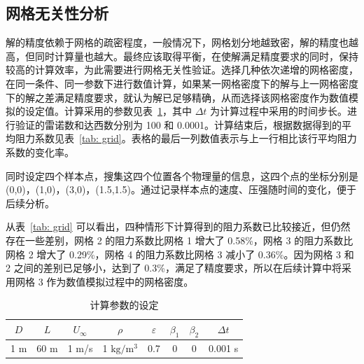 \subsection{网格无关性分析}\label{subsec: grid-independent}

解的精度依赖于网格的疏密程度，一般情况下，网格划分地越致密，解的精度也越高，但同时计算量也越大。最终应该取得平衡，在使解满足精度要求的同时，保持较高的计算效率，为此需要进行网格无关性验证。选择几种依次递增的网格密度，在同一条件、同一参数下进行数值计算，如果某一网格密度下的解与上一网格密度下的解之差满足精度要求，就认为解已足够精确，从而选择该网格密度作为数值模拟的设定值。计算采用的参数见表~\ref{tab: parameters}，其中 $\Delta t$ 为计算过程中采用的时间步长。进行验证的雷诺数和达西数分别为 100 和 0.0001。计算结束后，根据数据得到的平均阻力系数见表~\ref{tab: grid}。表格的最后一列数值表示与上一行相比该行平均阻力系数的变化率。

同时设定四个样本点，搜集这四个位置各个物理量的信息，这四个点的坐标分别是 (0,0)，(1,0)，(3,0)，(1.5,1.5)。通过记录样本点的速度、压强随时间的变化，便于后续分析。

从表~\ref{tab: grid} 可以看出，四种情形下计算得到的阻力系数已比较接近，但仍然存在一些差别，网格 2 的阻力系数比网格 1 增大了 0.58\%，网格 3 的阻力系数比网格 2 增大了 0.29\%，网格 4 的阻力系数比网格 3 减小了 0.36\%。因为网格 3 和 2 之间的差别已足够小，达到了 0.3\%，满足了精度要求，所以在后续计算中将采用网格 3 作为数值模拟过程中的网格密度。

\begin{table}[ht]
	\caption{计算参数的设定}\label{tab: parameters}
	\vspace{.5em}\centering\wuhao
	\begin{tabular}{*{8}{c}}
		\toprule[1.5pt]
		$D$ & $L$ & $U_{\infty}$ & $\rho$ & $\varepsilon$ & $\beta_1$ & $\beta_2$ & $\Delta t$\\
		\midrule[1pt]
		1 m & 60 m & 1 m/s & 1 $\mathrm{kg}/\mathrm{m}^3$ & 0.7 & 0 & 0 & 0.001 s\\
		\bottomrule[1.5pt]
	\end{tabular}
\end{table}

